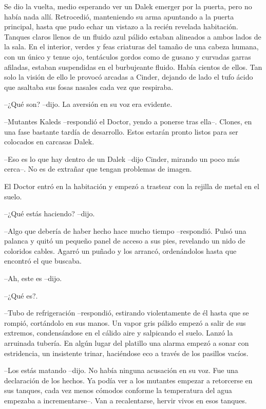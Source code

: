 Se dio la vuelta, medio esperando ver un Dalek emerger por la puerta, pero no había nada allí. Retrocedió, manteniendo su arma apuntando a la puerta principal, hasta que pudo echar un vistazo a la recién revelada habitación.
Tanques claros llenos de un fluido azul pálido estaban alineados a ambos lados de la sala. En el interior, verdes y feas criaturas del tamaño de una cabeza humana, con un único y tenue ojo, tentáculos gordos como de gusano y curvadas garras afiladas, estaban suspendidas en el burbujeante fluido. Había cientos de ellos. Tan solo la visión de ello le provocó arcadas a Cinder, dejando de lado el tufo ácido que asaltaba sus fosas nasales cada vez que respiraba.

--¿Qué son? --dijo. La aversión en su voz era evidente. 

--Mutantes Kaleds --respondió el Doctor, yendo a ponerse tras ella--. Clones, en una fase bastante tardía de desarrollo. Estos estarán pronto listos para ser colocados en carcasas Dalek.

--Eso es lo que hay dentro de un Dalek --dijo Cinder, mirando un poco más cerca--. No es de extrañar que tengan problemas de imagen.

El Doctor entró en la habitación y empezó a trastear con la rejilla de metal en el suelo.

--¿Qué estás haciendo? --dijo. 

--Algo que debería de haber hecho hace mucho tiempo --respondió. Pulsó una palanca y quitó un pequeño panel de acceso a sus pies, revelando un nido de coloridos cables. Agarró un puñado y los arrancó, ordenándolos hasta que encontró el que buscaba.

--Ah, este es --dijo.

--¿Qué es?.

--Tubo de refrigeración --respondió, estirando violentamente de él hasta que se rompió, cortándolo en sus manos. Un vapor gris pálido empezó a salir de sus extremos, condensándose en el cálido aire y salpicando el suelo. Lanzó la arruinada tubería. En algún lugar del platillo una alarma empezó a sonar con estridencia, un insistente trinar, haciéndose eco a través de los pasillos vacíos.

--Los estás matando --dijo. No había ninguna acusación en su voz. Fue una declaración de los hechos. Ya podía ver a los mutantes empezar a retorcerse en sus tanques, cada vez menos cómodos conforme la temperatura del agua empezaba a incrementarse--. Van a recalentarse, hervir vivos en esos tanques.

